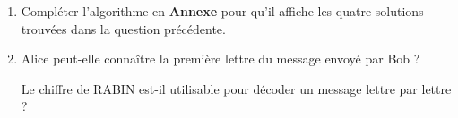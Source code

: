 \documentclass{cornouaille}
\begin{document}
\begin{exercice}[Spécialité][5]
\begin{enumerate}
\begin{enumerate}
\[\left\{\begin{array}{l c l}
x &\equiv&2\quad [3]\\
x&\equiv &8\quad[11]
\end{array}\right. \: \text{ ou } \left\{\begin{array}{l c l}
 x &\equiv& 0\quad[3]\\
 x &\equiv& 1 \quad[11]
 \end{array}\right.\: \text{ ou } \left\{\begin{array}{l c l}
x  &\equiv& 2\quad[3]\\
x &\equiv&1 \quad[11]
\end{array}\right.\: \text{ ou } \left\{\begin{array}{l c l}
x &\equiv& 0\quad [3]\\
x &\equiv& 8 \quad [11]
\end{array}\right.\]

		\item On admet que chacun de ces systèmes admet une unique solution entière $x$ telle que

$0 \leqslant x < 33$.

Déterminer, sans justification, chacune de ces solutions.
	\end{enumerate}
\item Compléter l'algorithme en \textbf{Annexe} pour qu'il affiche les quatre solutions trouvées dans la
question précédente.
\item Alice peut-elle connaître la première lettre du message envoyé par Bob ? 
	
Le \og chiffre de RABIN \fg{} est-il utilisable pour décoder un message lettre par lettre ?
\end{enumerate}
\end{exercice}
\newpage
\end{document}
